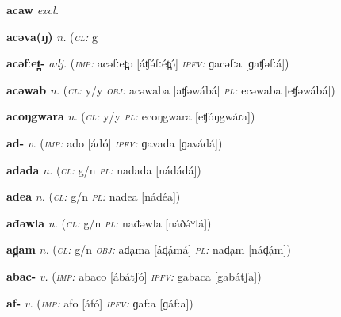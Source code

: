 \newentry
\headword\textbf{acaw}
\ipa{[atʃaw]}
\synpos\textit{excl.} 


\newentry
\headword\textbf{acəva(ŋ)}
\ipa{[áʧə́vá(ŋ)]}
\synpos\textit{n.} 
\class(\textit{\textsc{cl:}} {g}

\newentry
\headword\textbf{acəfːet̪-}
\ipa{[áʧə́fːét̪-]}
\synpos\textit{adj.} 
\imperative(\textit {\textsc{imp:}} acəfːet̪o [áʧə́fːét̪ó] 
\imperfective\textit{\textsc{ipfv:}} ɡacəfːa [ɡaʧəfːá])

\newentry
\headword\textbf{acəwab}
\ipa{[aʧəwáb]}
\synpos\textit{n.} 
\class(\textit{\textsc{cl:}} {y/y}
\object\textit{\textsc{obj:}} acəwaba [aʧəwábá]
\plural\textit{\textsc{pl:}} ecəwaba [eʧəwábá])

\newentry
\headword\textbf{acoŋgwara}
\synpos\textit{n.} 
\class(\textit{\textsc{cl:}} {y/y}
\plural\textit{\textsc{pl:}} ecoŋgwara [eʧóŋgwáɾa])

\newentry
\headword\textbf{ad-}
\ipa{[ád-]}
\synpos\textit{v.} 
\imperative(\textit {\textsc{imp:}} ado [ádó] 
\imperfective\textit{\textsc{ipfv:}} ɡavada [ɡavádá])

\newentry
\headword\textbf{adada}
\ipa{[ádádá]}
\synpos\textit{n.} 
\class(\textit{\textsc{cl:}} {g/n}
\plural\textit{\textsc{pl:}} nadada [nádádá])

\newentry
\headword\textbf{adea}
\ipa{[adea]}
\synpos\textit{n.} 
\class(\textit{\textsc{cl:}} {g/n}
\plural\textit{\textsc{pl:}} nadea [nádéa])

\newentry
\headword\textbf{ađəwla}
\ipa{[áðə́ʷlá]}
\synpos\textit{n.} 
\class(\textit{\textsc{cl:}} {g/n}
\plural\textit{\textsc{pl:}} nađəwla [náðə́ʷlá])

\newentry
\headword\textbf{ad̪am}
\ipa{[ád̪ám]}
\synpos\textit{n.} 
\class(\textit{\textsc{cl:}} {g/n}
\object\textit{\textsc{obj:}} ad̪ama [ád̪ámá]
\plural\textit{\textsc{pl:}} nad̪am [nád̪ám])

\newentry
\headword\textbf{abac-}
\ipa{[abátʃ-]}
\synpos\textit{v.} 
\imperative(\textit {\textsc{imp:}} abaco [ábátʃó] 
\imperfective\textit{\textsc{ipfv:}} gabaca [gabátʃa])

\newentry
\headword\textbf{af-}
\ipa{[áf-]}
\synpos\textit{v.} 
\imperative(\textit {\textsc{imp:}} afo [áfó] 
\imperfective\textit{\textsc{ipfv:}} ɡaf:a [ɡáf:a])

